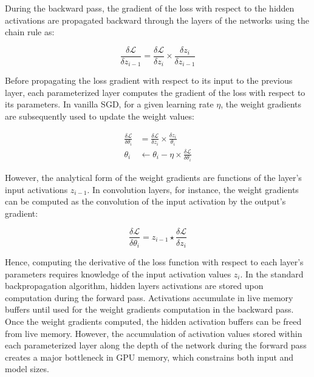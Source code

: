 \documentclass[twocolumn]{bmcart}
\begin{document}
During the backward pass, the gradient of the loss with respect to the hidden activations are propagated backward through the layers of the networks using the chain rule as:


\begin{equation}
\frac{\delta \mathcal{L}}{\delta z_{i-1}} = \frac{\delta \mathcal{L}}{\delta z_{i}}  \times \frac{\delta z_{i}}{\delta z_{i-1}}
\end{equation}

Before propagating the loss gradient with respect to its input to the previous layer, 
each parameterized layer computes the gradient of the loss with respect to its parameters. 
In vanilla SGD, for a given learning rate $\eta$, the weight gradients are subsequently used to update the weight values:

\begin{subequations}
\begin{align}
\frac{\delta \mathcal{L}}{\delta \theta_i} & =\frac{\delta \mathcal{L}}{\delta z_{i}}  \times \frac{\delta z_{i}}{\theta_i} \\
\theta_i & \leftarrow \theta_i - \eta \times \frac{\delta \mathcal{L}}{\delta \theta_i}
\end{align}
\end{subequations}

However, the analytical form of the weight gradients are functions of the layer's input activations $z_{i-1}$. 
In convolution layers, for instance, the weight gradients can be computed as the convolution of the input activation by the output's gradient:

 \begin{equation}
\frac{\delta \mathcal{L}}{\delta \theta_i} = z_{i-1} \star \frac{\delta \mathcal{L}}{\delta z_i} 
 \end{equation}

Hence, computing the derivative of the loss function with respect to each layer's parameters requires knowledge of the input activation values $z_i$.  In the standard backpropagation algorithm, hidden layers activations are stored upon computation during the forward pass. Activations accumulate in live memory buffers until used for the weight gradients computation in the backward pass. Once the weight gradients computed, the hidden activation buffers can be freed from live memory. 
However, the accumulation of activation values stored within each parameterized layer along the depth of the network during the forward pass creates a major bottleneck in GPU memory, which constrains both input and model sizes.
\end{document}
